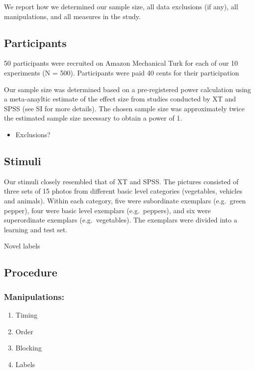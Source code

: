 \documentclass[english,floatsintext,man]{apa6}
\providecommand{\tightlist}{%
  \setlength{\itemsep}{0pt}\setlength{\parskip}{0pt}}
\theoremstyle{definition}
\theoremstyle{definition}
\theoremstyle{remark}
\begin{document}
We report how we determined our sample size, all data exclusions (if
any), all manipulations, and all measures in the study.

\subsection{Participants}\label{participants}

50 participants were recruited on Amazon Mechanical Turk for each of our
10 experiments (N = 500). Participants were paid 40 cents for their
participation

Our sample size was determined based on a pre-registered power
calculation using a meta-anayltic estimate of the effect size from
studies conducted by XT and SPSS (see SI for more details). The chosen
sample size was approximately twice the estimated sample size necessary
to obtain a power of 1.

\begin{itemize}
\tightlist
\item
  Exclusions?
\end{itemize}

\subsection{Stimuli}\label{stimuli}

Our stimuli closely resembled that of XT and SPSS. The pictures
consisted of three sets of 15 photos from different basic level
categories (vegetables, vehicles and animals). Within each category,
five were subordinate exemplars (e.g.~green pepper), four were basic
level exemplars (e.g.~peppers), and six were superordinate exemplars
(e.g.~vegetables). The exemplars were divided into a learning and test
set.

Novel labels

\subsection{Procedure}\label{procedure}

\subsubsection{Manipulations:}\label{manipulations}

\begin{enumerate}
\def\labelenumi{(\arabic{enumi})}
\tightlist
\item
  Timing
\item
  Order
\item
  Blocking
\item
  Labels
\end{enumerate}
\end{document}
